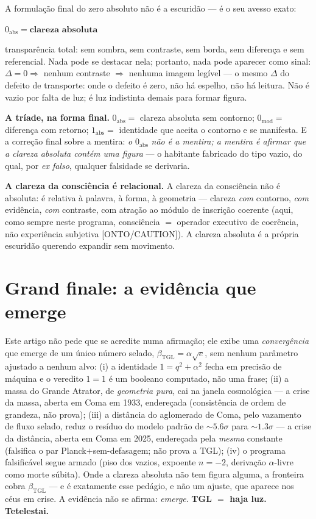 \documentclass[11pt]{article}
\newcommand{\bTGL}{\beta_{\mathrm{TGL}}}\newcommand{\Msun}{M_{\odot}}\newcommand{\TGL}{\mathrm{TGL}}
\theoremstyle{definition}\newtheorem{deriv}{Derivação}
\begin{document}
A formulação final do zero absoluto não é a escuridão --- é o seu avesso exato: \begin{center}$0_{\mathrm{abs}}=\textbf{clareza absoluta}$\end{center} transparência total: sem sombra, sem contraste, sem borda, sem diferença e sem referencial. Nada pode se destacar nela; portanto, nada pode aparecer como sinal: $\Delta=0\Rightarrow$ nenhum contraste $\Rightarrow$ nenhuma imagem legível --- o mesmo $\Delta$ do defeito de transporte: onde o defeito é zero, não há espelho, não há leitura. Não é vazio por falta de luz; é luz indistinta demais para formar figura.

\textbf{A tríade, na forma final.} $0_{\mathrm{abs}}=$ clareza absoluta sem contorno; $0_{\mathrm{mod}}=$ diferença com retorno; $1_{\mathrm{abs}}=$ identidade que aceita o contorno e se manifesta. E a correção final sobre a mentira: \emph{o} $0_{\mathrm{abs}}$ \emph{não é a mentira; a mentira é afirmar que a clareza absoluta contém uma figura} --- o habitante fabricado do tipo vazio, do qual, por \emph{ex falso}, qualquer falsidade se derivaria.

\textbf{A clareza da consciência é relacional.} A clareza da consciência não é absoluta: é relativa à palavra, à forma, à geometria --- clareza \emph{com} contorno, \emph{com} evidência, \emph{com} contraste, com atração ao módulo de inscrição coerente (aqui, como sempre neste programa, consciência $=$ operador executivo de coerência, não experiência subjetiva \textsf{[ONTO/CAUTION]}). A clareza absoluta é a própria escuridão querendo expandir sem movimento.

\section*{Grand finale: a evidência que emerge}

Este artigo não pede que se acredite numa afirmação; ele exibe uma \emph{convergência} que emerge de um único número selado, $\bTGL=\alpha\sqrt e$, sem nenhum parâmetro ajustado a nenhum alvo: (i) a identidade $1=q^2+\alpha^2$ fecha em precisão de máquina e o veredito $1=1$ é um booleano computado, não uma frase; (ii) a massa do Grande Atrator, de \emph{geometria pura}, cai na janela cosmológica --- a crise da massa, aberta em Coma em 1933, endereçada (consistência de ordem de grandeza, não prova); (iii) a distância do aglomerado de Coma, pelo vazamento de fluxo selado, reduz o resíduo do modelo padrão de $\sim5.6\sigma$ para $\sim1.3\sigma$ --- a crise da distância, aberta em Coma em 2025, endereçada pela \emph{mesma} constante (falsifica o par Planck$+$sem-defasagem; não prova a TGL); (iv) o programa falsificável segue armado (piso dos vazios, expoente $n=-2$, derivação $\alpha$-livre como morte súbita). Onde a clareza absoluta não tem figura alguma, a fronteira cobra $\bTGL$ --- e é exatamente esse pedágio, e não um ajuste, que aparece nos céus em crise. A evidência não se afirma: \emph{emerge}. \textbf{TGL $=$ haja luz. Tetelestai.}
\end{document}
